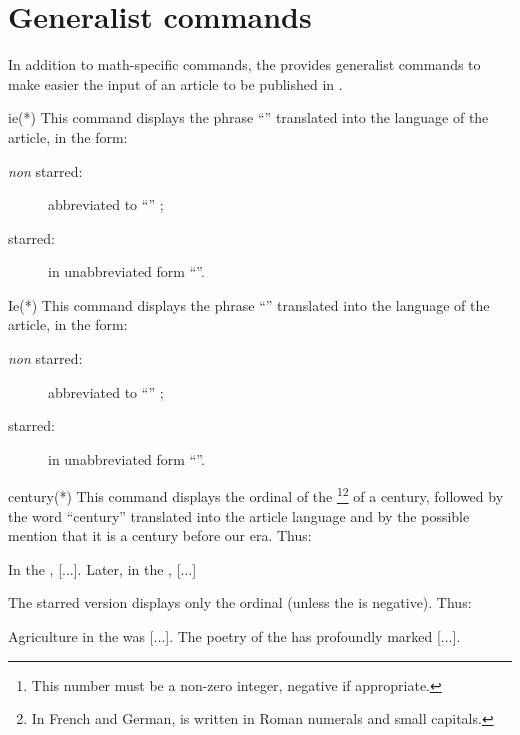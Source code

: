 \documentclass[english,nolocaltoc]{nwejmart}
\newtheorem[style=definition]{fact}
\newtheorem[title=experience]{experience}
\newtheorem[title-plural=rings]{ring}
\newtheorem[title=ideal,title-plural=ideals]{ideal}
\begin{document}
\section{Generalist commands}
\label{sec:comm-gener}

In addition to math-specific commands, the \nwejmauthorcl{} provides
generalist commands to make easier the input of an article to be
published in  \nwejm{}.


\begin{docCommand}{ie(*)}{}
  This command displays the phrase  \enquote{\ie*{}} translated into
  the language of the article, in the form:
  \begin{description}
  \item[\emph{non} starred:] abbreviated to \enquote{\ie{}} ;
  \item[starred:] in unabbreviated form \enquote{\ie*{}}.
  \end{description}
\end{docCommand}

\begin{docCommand}{Ie(*)}{}
  This command displays the phrase \enquote{\Ie*{}} translated into
  the language of the article, in the form: 
  \begin{description}
     \item[\emph{non} starred:] abbreviated to \enquote{\Ie{}} ;
  \item[starred:] in unabbreviated form \enquote{\Ie*{}}.
  \end{description}
\end{docCommand}

\begin{docCommand}{century(*)}{}
  This command displays the ordinal of the \footnote{This
    number must be a non-zero integer, negative if
    appropriate.}\footnote{In French and German,   is
    written in Roman numerals and small capitals.} of a century,
  followed by the word  \enquote{century} translated into the article language
  and  by the possible mention that it is a century before our era. Thus:
\begin{bodycode}
In the , [...]. Later, in the , [...]
\end{bodycode}
  The starred version displays only the ordinal (unless the   is
  negative). Thus:
\begin{bodycode}
Agriculture in the  was [...].
The poetry of the  has profoundly marked [...].
\end{bodycode}
\end{docCommand}
\end{document}
